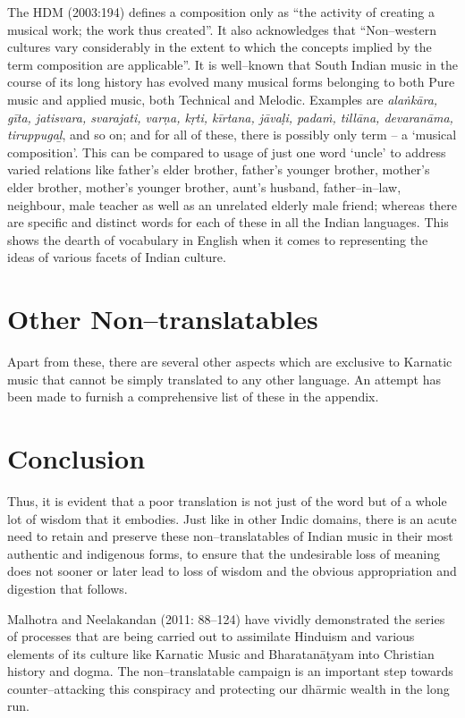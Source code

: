 The HDM (2003:194) defines a composition only as “the activity of creating a musical work; the work thus created”. It also acknowledges that “Non–western cultures vary considerably in the extent to which the concepts implied by the term composition are applicable”. It is well–known that South Indian music in the course of its long history has evolved many musical forms belonging to both Pure music and applied music, both Technical and Melodic. Examples are \textit{alaṅkāra, gīta, jatisvara, svarajati, varṇa, kṛti, kīrtana, jāvaḷi, padaṁ, tillāna, devaranāma, tiruppugaḻ}, and so on; and for all of these, there is possibly only term – a ‘musical composition’\supskpt{\ref{999–aside.xhtmlid–c2–en8}}. This can be compared to usage of just one word ‘uncle’ to address varied relations like father’s elder brother, father’s younger brother, mother’s elder brother, mother’s younger brother, aunt’s husband, father–in–law, neighbour, male teacher as well as an unrelated elderly male friend; whereas there are specific and distinct words for each of these in all the Indian languages. This shows the dearth of vocabulary in English when it comes to representing the ideas of various facets of Indian culture.


\section*{Other Non–translatables}

Apart from these, there are several other aspects which are exclusive to Karnatic music that cannot be simply translated to any other language. An attempt has been made to furnish a comprehensive list of these in the appendix.


\section*{Conclusion}

Thus, it is evident that a poor translation is not just of the word but of a whole lot of wisdom that it embodies. Just like in other Indic domains, there is an acute need to retain and preserve these non–translatables of Indian music in their most authentic and indigenous forms, to ensure that the undesirable loss of meaning does not sooner or later lead to loss of wisdom and the obvious appropriation and digestion that follows. 

Malhotra and Neelakandan (2011: 88–124) have vividly demonstrated the series of processes that are being carried out to assimilate Hinduism and various elements of its culture like Karnatic Music and Bharatanāṭyam into Christian history and dogma. The non–translatable campaign is an important step towards counter–attacking this conspiracy and protecting our dhārmic wealth in the long run.


